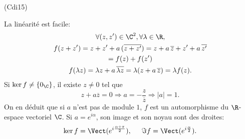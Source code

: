 \begin{tiny}(Cdi15)\end{tiny} La linéarité est facile:
\begin{multline*}
 \forall(z,z')\in \C^2, \forall \lambda \in \R,\\
 f(z+z') = z+z' + a\,(\overline{z + z'}) 
 = z+a\,\overline{z} + z'+a\,\overline{z'} \\
 = f(z) + f(z') \\
 f(\lambda z) = \lambda z + a\, \overline{\lambda z} 
 = \lambda (z + a\, \overline{z})
 = \lambda f(z).
\end{multline*}
Si $\ker f \neq \left\lbrace 0_\C\right\rbrace$, il existe $z\neq 0$ tel que
\[
 z+a\overline{z}= 0 \Rightarrow a = -\frac{z}{\overline{z}}
 \Rightarrow |a| = 1.
\]
On en déduit que si $a$ n'est pas de module $1$, $f$ est un automorphisme du $\R$-espace vectoriel $\C$.\newline
Si $a = e^{i \alpha}$, son image et son noyau sont des droites:
\[
 \ker f = \Vect(e^{i\frac{\alpha + \pi}{2}}), \hspace{0.5cm}
 \Im f = \Vect(e^{i\frac{\alpha}{2}}).
\]
